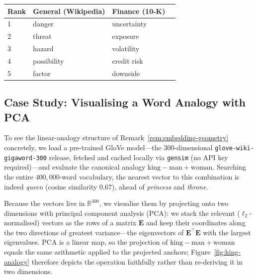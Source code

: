 \begin{deepdive}
\begin{example}
\begin{center}
  \label{tab:risk-neighbours}
  \begin{tabular}{llll}
    \toprule
    Rank & General (Wikipedia) & Finance (10-K) \\
    \midrule
    1 & danger      & uncertainty   \\
    2 & threat      & exposure      \\
    3 & hazard      & volatility    \\
    4 & possibility & credit risk   \\
    5 & factor      & downside      \\
    \bottomrule
  \end{tabular}
\end{center}
\end{example}

\subsection{Case Study: Visualising a Word Analogy with PCA}
\label{sec:embeddings-pca}

To see the linear-analogy structure of Remark~\ref{rem:embedding-geometry}
concretely, we load a pre-trained GloVe model---the 300-dimensional
\texttt{glove-wiki-gigaword-300} release, fetched and cached locally via
\texttt{gensim} (no API key required)---and evaluate the canonical analogy
$\text{king} - \text{man} + \text{woman}$.  Searching the entire
$400{,}000$-word vocabulary, the nearest vector to this combination is indeed
\emph{queen} (cosine similarity $0.67$), ahead of \emph{princess} and
\emph{throne}.

Because the vectors live in $\mathbb{R}^{300}$, we visualise them by projecting
onto two dimensions with principal component analysis (PCA): we stack the
relevant ($\ell_2$-normalised) vectors as the rows of a matrix $\mathbf{E}$ and
keep their coordinates along the two directions of greatest variance---the
eigenvectors of $\mathbf{E}^{\top}\mathbf{E}$ with the largest eigenvalues.
PCA is a linear map, so the projection of $\text{king} - \text{man} +
\text{woman}$ equals the same arithmetic applied to the projected anchors;
Figure~\ref{fig:king-analogy} therefore depicts the operation faithfully rather
than re-deriving it in two dimensions.


\end{deepdive}
